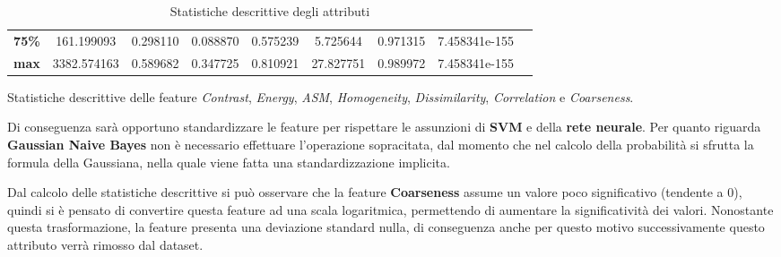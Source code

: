 \begin{table}[!ht]
\begin{subtable}[h]{1\textwidth}
{\begin{tabular}{c|c c c c c c c c}
                        \textbf{75\%}                                             & 161.199093        & 0.298110        & 0.088870     & 0.575239             & 5.725644               & 0.971315             & 7.458341e-155       \\
                        \textbf{max}                                              & 3382.574163       & 0.589682        & 0.347725     & 0.810921             & 27.827751              & 0.989972             & 7.458341e-155       \\ \hline
                  \end{tabular}}
            \caption{Statistiche descrittive delle feature \textit{Contrast}, \textit{Energy}, \textit{ASM}, \textit{Homogeneity}, \textit{Dissimilarity}, \textit{Correlation} e \textit{Coarseness}.}
            \label{tab:secondameta}
      \end{subtable}
      \caption{Statistiche descrittive degli attributi}
      \label{tab:desc-stat}
\end{table}
\newpage
Di conseguenza sarà opportuno standardizzare le feature per rispettare le
assunzioni di \textbf{SVM} e della \textbf{rete neurale}. Per quanto riguarda
\textbf{Gaussian Naive Bayes} non è necessario effettuare l'operazione
sopracitata, dal momento che nel calcolo della probabilità si sfrutta la formula
della Gaussiana, nella quale viene fatta una standardizzazione implicita.

Dal calcolo delle statistiche descrittive si può osservare che la feature
\textbf{Coarseness} assume un valore poco significativo (tendente a $0$), quindi
si è pensato di convertire questa feature ad una scala logaritmica, permettendo
di aumentare la significatività dei valori. Nonostante questa trasformazione,
la feature presenta una deviazione standard nulla, di conseguenza anche per 
questo motivo successivamente questo attributo verrà rimosso dal dataset.

